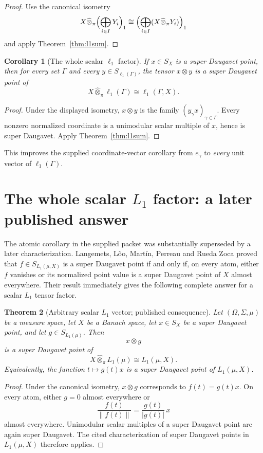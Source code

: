 \documentclass[11pt]{article}
\newtheorem{theorem}{Theorem}[section]
\newtheorem{corollary}[theorem]{Corollary}
\theoremstyle{definition}
\newcommand{\whotpi}{\widehat{\otimes}_{\pi}}
\begin{document}
\begin{proof}
Use the canonical isometry
\[
 X\whotpi\Bigl(\bigoplus_{i\in I}Y_i\Bigr)_1
 \cong
 \Bigl(\bigoplus_{i\in I}(X\whotpi Y_i)\Bigr)_1
\]
and apply Theorem~\ref{thm:l1sum}.
\end{proof}

\begin{corollary}[The whole scalar $\ell_1$ factor]\label{cor:ell1}
If $x\in S_X$ is a super Daugavet point, then for every set $\Gamma$ and
every $y\in S_{\ell_1(\Gamma)}$, the tensor $x\otimes y$ is a super Daugavet
point of
\[
 X\whotpi\ell_1(\Gamma)\cong\ell_1(\Gamma,X).
\]
\end{corollary}

\begin{proof}
Under the displayed isometry, $x\otimes y$ is the family
$(y_\gamma x)_{\gamma\in\Gamma}$.  Every nonzero normalized coordinate is a
unimodular scalar multiple of $x$, hence is super Daugavet.  Apply
Theorem~\ref{thm:l1sum}.
\end{proof}

This improves the supplied coordinate-vector corollary from $e_\gamma$ to
\emph{every} unit vector of $\ell_1(\Gamma)$.

\section{The whole scalar $L_1$ factor: a later published answer}\label{sec:L1}

The atomic corollary in the supplied packet was substantially superseded by a
later characterization.  Langemets, L\~oo, Mart\'in, Perreau and Rueda Zoca
proved that $f\in S_{L_1(\mu,X)}$ is a super Daugavet point if and only if, on
every atom, either $f$ vanishes or its normalized point value is a super
Daugavet point of $X$ almost everywhere.  Their result immediately gives the
following complete answer for a scalar $L_1$ tensor factor.

\begin{theorem}[Arbitrary scalar $L_1$ vector; published consequence]
\label{thm:L1}
Let $(\Omega,\Sigma,\mu)$ be a measure space, let $X$ be a Banach space, let
$x\in S_X$ be a super Daugavet point, and let $g\in S_{L_1(\mu)}$.  Then
\[
       x\otimes g
\]
is a super Daugavet point of
\[
 X\whotpi L_1(\mu)\cong L_1(\mu,X).
\]
Equivalently, the function $t\mapsto g(t)x$ is a super Daugavet point of
$L_1(\mu,X)$.
\end{theorem}

\begin{proof}
Under the canonical isometry, $x\otimes g$ corresponds to
$f(t)=g(t)x$.  On every atom, either $g=0$ almost everywhere or
\[
   \frac{f(t)}{\|f(t)\|}=\frac{g(t)}{|g(t)|}\,x
\]
almost everywhere.  Unimodular scalar multiples of a super Daugavet point are
again super Daugavet.  The cited characterization of super Daugavet points in
$L_1(\mu,X)$ therefore applies.
\end{proof}
\end{document}
